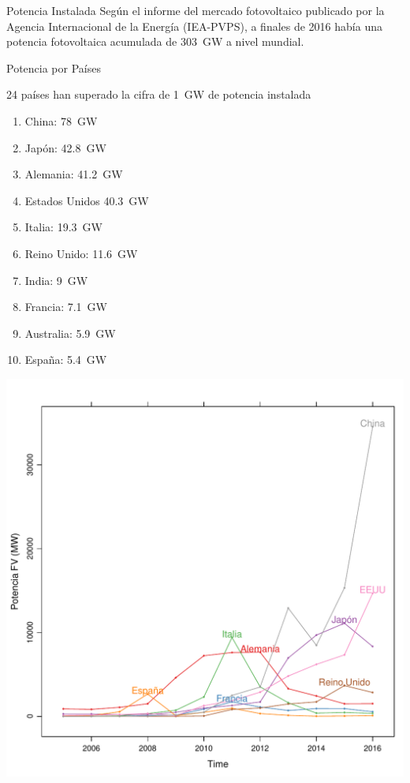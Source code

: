 \documentclass[xcolor={usenames,svgnames,dvipsnames}]{beamer}
\begin{document}
\begin{frame}[label={sec:orgbad5154}]{Potencia Instalada}
Según el informe del mercado fotovoltaico publicado por la Agencia
Internacional de la Energía (IEA-PVPS), a finales de 2016 había una
potencia fotovoltaica acumulada de \SI{303}{\giga\watt} a nivel
mundial.
\end{frame}

\begin{frame}[label={sec:orgfe33869}]{Potencia por Países}
\begin{block}{24 países han superado la cifra de \SI{1}{\giga\watt} de potencia instalada}
\begin{enumerate}
\item China: \SI{78}{\giga\watt}
\item Japón: \SI{42.8}{\giga\watt}
\item Alemania: \SI{41.2}{\giga\watt}
\item Estados Unidos \SI{40.3}{\giga\watt}
\item Italia: \SI{19.3}{\giga\watt}
\item Reino Unido: \SI{11.6}{\giga\watt}
\item India: \SI{9}{\giga\watt}
\item Francia: \SI{7.1}{\giga\watt}
\item Australia: \SI{5.9}{\giga\watt}
\item España: \SI{5.4}{\giga\watt}
\end{enumerate}
\end{block}
\end{frame}

\begin{frame}[label={sec:orgae5abfc}]{}
\begin{center}
\includegraphics[width=.9\linewidth]{../figs/PVWorld.pdf}
\end{center}
\end{frame}
\end{document}
